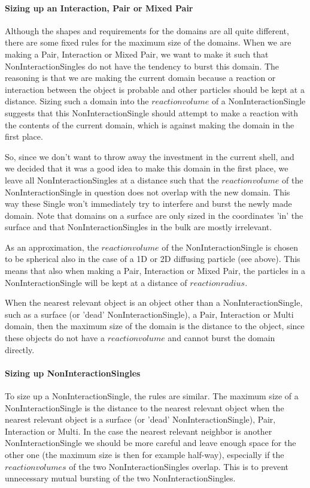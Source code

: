 \documentclass[a4paper,11pt]{article}
\begin{document}
\paragraph{Sizing up an Interaction, Pair or Mixed Pair}
Although the shapes and requirements for the domains are all quite different, there are some fixed rules for the maximum size
of the domains.
When we are making a Pair, Interaction or Mixed Pair, we want to make it such that NonInteractionSingles do not have the
tendency to burst this domain. The reasoning is that we are making the current domain because a reaction or interaction
between the object is probable and other particles should be kept at a distance. Sizing such a domain into the $reaction
volume$ of a NonInteractionSingle suggests that this NonInteractionSingle should attempt to make a reaction with the contents
of the current domain, which is against making the domain in the first place.

So, since we don't want to throw away the investment in the current shell, and we decided that it was a good idea to make this
domain in the first place, we leave all NonInteractionSingles at a distance such that the $reaction volume$ of the
NonInteractionSingle in question does not overlap with the new domain. This way these Single won't immediately try to
interfere and burst the newly made domain.
Note that domains on a surface are only sized in the coordinates 'in' the surface and that NonInteractionSingles in the bulk
are mostly irrelevant.

As an approximation, the $reaction volume$ of the NonInteractionSingle is chosen to be spherical also in the case of a 1D or
2D diffusing particle
(see above). This means that also when making a Pair, Interaction or Mixed Pair, the particles in a NonInteractionSingle will
be kept at a distance of $reaction radius$.

When the nearest relevant object is an object other than a NonInteractionSingle, such as a surface (or 'dead'
NonInteractionSingle), a
Pair, Interaction or Multi domain, then the maximum size of the domain is the distance to the object, since these objects do
not have a $reaction volume$ and cannot burst the domain directly.

\paragraph{Sizing up NonInteractionSingles}
To size up a NonInteractionSingle, the rules are similar.
The maximum size of a NonInteractionSingle is the distance to the nearest relevant object when the nearest relevant object is
a surface (or 'dead' NonInteractionSingle), Pair, Interaction or Multi.
In the case the nearest relevant neighbor is another NonInteractionSingle we should be more careful
and leave enough space for the other one (the maximum size is then for example half-way), especially if the $reaction volumes$
of the two NonInteractionSingles overlap.
This is to prevent unnecessary mutual bursting of the two NonInteractionSingles.
\end{document}
